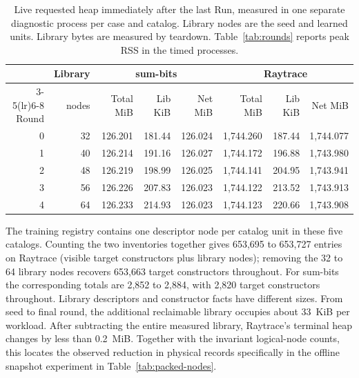 \begin{table}[ht]
\centering\small
\caption{Live requested heap immediately after the last Run, measured in one separate diagnostic process per case and catalog. Library nodes are the seed and learned units. Library bytes are measured by teardown. Table~\ref{tab:rounds} reports peak RSS in the timed processes.}
\label{tab:net-heap}
\begin{tabular}{rrrrrrrr}
\toprule
& Library & \multicolumn{3}{c}{sum-bits} & \multicolumn{3}{c}{Raytrace}\\
\cmidrule(lr){3-5}\cmidrule(lr){6-8}
Round & nodes & Total MiB & Lib KiB & Net MiB & Total MiB & Lib KiB & Net MiB\\
\midrule
0 & 32 & 126.201 & 181.44 & 126.024 & 1,744.260 & 187.44 & 1,744.077 \\
1 & 40 & 126.214 & 191.16 & 126.027 & 1,744.172 & 196.88 & 1,743.980 \\
2 & 48 & 126.219 & 198.99 & 126.025 & 1,744.141 & 204.95 & 1,743.941 \\
3 & 56 & 126.226 & 207.83 & 126.023 & 1,744.122 & 213.52 & 1,743.913 \\
4 & 64 & 126.233 & 214.93 & 126.023 & 1,744.123 & 220.66 & 1,743.908 \\
\bottomrule
\end{tabular}
\end{table}

The training registry contains one descriptor node per catalog unit in these five catalogs. Counting the two inventories together gives 653,695 to 653,727 entries on Raytrace (visible target constructors plus library nodes); removing the 32 to 64 library nodes recovers 653,663 target constructors throughout. For sum-bits the corresponding totals are 2,852 to 2,884, with 2,820 target constructors throughout. Library descriptors and constructor facts have different sizes. From seed to final round, the additional reclaimable library occupies about 33~KiB per workload. After subtracting the entire measured library, Raytrace's terminal heap changes by less than 0.2~MiB. Together with the invariant logical-node counts, this locates the observed reduction in physical records specifically in the offline snapshot experiment in Table~\ref{tab:packed-nodes}.
